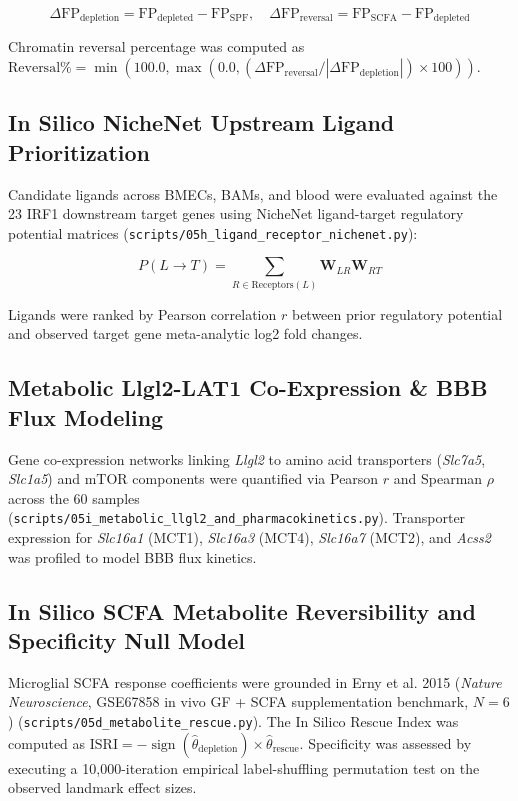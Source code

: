 \documentclass[10pt,a4paper]{article}
\begin{document}
\begin{equation}
\Delta \text{FP}_{\text{depletion}} = \text{FP}_{\text{depleted}} - \text{FP}_{\text{SPF}}, \quad \Delta \text{FP}_{\text{reversal}} = \text{FP}_{\text{SCFA}} - \text{FP}_{\text{depleted}}
\end{equation}

Chromatin reversal percentage was computed as $\text{Reversal} \% = \min(100.0, \max(0.0, (\Delta \text{FP}_{\text{reversal}} / |\Delta \text{FP}_{\text{depletion}}|) \times 100))$.

\subsection{In Silico NicheNet Upstream Ligand Prioritization}
Candidate ligands across BMECs, BAMs, and blood were evaluated against the 23 IRF1 downstream target genes using NicheNet ligand-target regulatory potential matrices (\texttt{\small scripts/05h\_ligand\_receptor\_nichenet.py}):

\begin{equation}
P(L \to T) = \sum_{R \in \text{Receptors}(L)} \mathbf{W}_{LR} \mathbf{W}_{RT}
\end{equation}

Ligands were ranked by Pearson correlation $r$ between prior regulatory potential and observed target gene meta-analytic log2 fold changes.

\subsection{Metabolic Llgl2-LAT1 Co-Expression \& BBB Flux Modeling}
Gene co-expression networks linking \textit{Llgl2} to amino acid transporters (\textit{Slc7a5}, \textit{Slc1a5}) and mTOR components were quantified via Pearson $r$ and Spearman $\rho$ across the 60 samples (\texttt{\small scripts/05i\_metabolic\_llgl2\_and\_pharmacokinetics.py}). Transporter expression for \textit{Slc16a1} (MCT1), \textit{Slc16a3} (MCT4), \textit{Slc16a7} (MCT2), and \textit{Acss2} was profiled to model BBB flux kinetics.

\subsection{In Silico SCFA Metabolite Reversibility and Specificity Null Model}
Microglial SCFA response coefficients were grounded in Erny et al. 2015 (\textit{Nature Neuroscience}, GSE67858 in vivo GF + SCFA supplementation benchmark, $N=6$) (\texttt{\small scripts/05d\_metabolite\_rescue.py}). The In Silico Rescue Index was computed as $\text{ISRI} = -\operatorname{sign}(\hat{\theta}_{\text{depletion}}) \times \hat{\theta}_{\text{rescue}}$. Specificity was assessed by executing a 10,000-iteration empirical label-shuffling permutation test on the observed landmark effect sizes.
\end{document}
